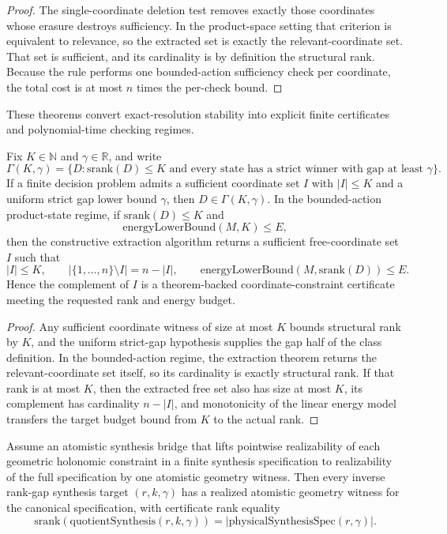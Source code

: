 \begin{proof}
The single-coordinate deletion test removes exactly those coordinates whose erasure destroys sufficiency. In the product-space setting that criterion is equivalent to relevance, so the extracted set is exactly the relevant-coordinate set. That set is sufficient, and its cardinality is by definition the structural rank. Because the rule performs one bounded-action sufficiency check per coordinate, the total cost is at most $n$ times the per-check bound.
\end{proof}

These theorems convert exact-resolution stability into explicit finite certificates and polynomial-time checking regimes.

\begin{theorem}\label{thm:inverse-rank-gap-design}
Fix $K \in \mathbb{N}$ and $\gamma \in \mathbb{R}$, and write
\[
\Gamma(K,\gamma)
=
\bigl\{D : \mathrm{srank}(D) \le K \text{ and every state has a strict winner with gap at least } \gamma\bigr\}.
\]
If a finite decision problem admits a sufficient coordinate set $I$ with $|I|\le K$ and a uniform strict gap lower bound $\gamma$, then $D\in\Gamma(K,\gamma)$. In the bounded-action product-state regime, if $\mathrm{srank}(D)\le K$ and
\[
\mathrm{energyLowerBound}(M,K) \le E,
\]
then the constructive extraction algorithm returns a sufficient free-coordinate set $I$ such that
\[
|I| \le K,
\qquad
|\{1,\dots,n\}\setminus I| = n-|I|,
\qquad
\mathrm{energyLowerBound}(M,\mathrm{srank}(D)) \le E.
\]
Hence the complement of $I$ is a theorem-backed coordinate-constraint certificate meeting the requested rank and energy budget.
\end{theorem}

\begin{proof}
Any sufficient coordinate witness of size at most $K$ bounds structural rank by $K$, and the uniform strict-gap hypothesis supplies the gap half of the class definition. In the bounded-action regime, the extraction theorem returns the relevant-coordinate set itself, so its cardinality is exactly structural rank. If that rank is at most $K$, then the extracted free set also has size at most $K$, its complement has cardinality $n-|I|$, and monotonicity of the linear energy model transfers the target budget bound from $K$ to the actual rank.
\end{proof}

\begin{theorem}\label{thm:inverse-design-atomistic-bridge}
Assume an atomistic synthesis bridge that lifts pointwise realizability of each geometric holonomic constraint in a finite synthesis specification to realizability of the full specification by one atomistic geometry witness. Then every inverse rank-gap synthesis target $(r,k,\gamma)$ has a realized atomistic geometry witness for the canonical specification, with certificate rank equality
\[
\mathrm{srank}(\mathrm{quotientSynthesis}(r,k,\gamma))
=
\bigl|\mathrm{physicalSynthesisSpec}(r,\gamma)\bigr|.
\]
\end{theorem}

